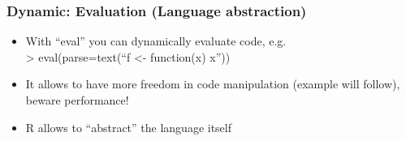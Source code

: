 \documentclass[bigger]{beamer}
\begin{document}
\begin{frame}
\frametitle{Dynamic: Evaluation (Language abstraction)}
\label{sec-4-4}
\begin{itemize}

\item With ``eval'' you can dynamically evaluate code, e.g.\\
\label{sec-4-4-1}%
> eval(parse=text(``f <- function(x) x''))

\item It allows to have more freedom in code manipulation (example will follow), beware performance!
\label{sec-4-4-2}%

\item R allows to ``abstract'' the language itself
\label{sec-4-4-3}%
\end{itemize} %
\end{frame}
\end{document}

